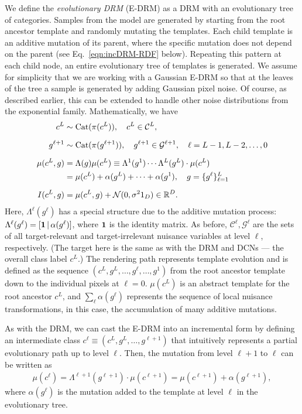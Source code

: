 \documentclass[12pt]{article}
\newcommand{\R}[0]{{ \mathbb{R} }}
\newcommand{\Cl}[0]{{ \mathcal{C} }}
\newcommand{\G}[0]{{ \mathcal{G} }}
\begin{document}
We define the \emph{evolutionary DRM} (E-DRM) as a DRM with an evolutionary tree of categories. Samples from the model are generated by starting from the root ancestor template and randomly mutating the templates. Each child template is an additive mutation of its parent, where the specific mutation does not depend on the parent (see Eq.~\ref{eqn:incDRM-RDF} below). 
Repeating this pattern at each child node, an entire evolutionary tree of templates is generated. We assume for simplicity that we are working with a Gaussian E-DRM so that at the leaves of the tree a sample is generated by adding Gaussian pixel noise. Of course, as described earlier, this can be extended to handle other noise distributions from the exponential family. Mathematically, we have
\begin{align} 
	c^{L} &\sim{\rm Cat}(\pi(c^{L})), \quad c^{L} \in \Cl^{L},	
	\nonumber \\[2mm]
	g^{\ell+1} &\sim{\rm Cat}(\pi(g^{\ell+1})), \quad g^{\ell+1} \in \G^{\ell+1}, \quad \ell = L-1, L-2, \dots, 0 	 
	\nonumber \\[2mm]	
	\mu(c^{L}, g) &=  \Lambda(g) \mu(c^{L}) \equiv \Lambda^{1}(g^{1}) \cdots \Lambda^{L}(g^{L}) \cdot \mu(c^{L})
	\nonumber \\
	&= \mu(c^{L}) + \alpha(g^{L}) + \cdots + \alpha(g^{1}), \quad g=\{g^{\ell}\}_{\ell=1}^{L}
	\nonumber \\[2mm]
	I(c^{L},g) &= \mu(c^{L}, g) + \mathcal{N}(0, \sigma^{2} 1_{D}) \in \R^{D}.
	\label{eqn:DRM-RDF}
\end{align}
Here, $\Lambda^{\ell}(g^{\ell})$ has a special structure due to the additive mutation process: $\Lambda^{\ell}(g^{\ell}) = [ {\bf 1} \, |\, \alpha(g^{\ell}) ]$, where ${\bf 1}$ is the identity matrix. As before, $\Cl^{\ell}, \G^{\ell}$ are the sets of all target-relevant and target-irrelevant nuisance variables at level $\ell$, respectively. (The target here is the same as with the DRM and DCNs --- the overall class label $c^L$.) The rendering path represents template evolution and is defined as the sequence $(c^{L},g^{L},\ldots,g^{\ell},\ldots,g^{1})$ from the root ancestor template down to the individual pixels at $\ell=0$.  $\mu(c^{L})$ is an abstract template for the root ancestor $c^{L}$, and $\sum_{\ell} \alpha(g^{\ell})$ represents the sequence of local nuisance transformations, in this case, the accumulation of many additive mutations. 

As with the DRM, we can cast the E-DRM into an incremental form by defining an intermediate class $c^{\ell} \equiv (c^{L}, g^{L}, \ldots, g^{\ell+1})$ that intuitively represents a partial evolutionary path up to level $\ell$. Then, the mutation from level $\ell+1$ to $\ell$ can be written as
\begin{align} 
   \mu(c^{\ell}) = \Lambda^{\ell+1}(g^{\ell+1}) \cdot \mu(c^{\ell+1}) = \mu(c^{\ell+1}) + \alpha(g^{\ell + 1}),
   \label{eqn:incDRM-RDF}
\end{align}
where $\alpha(g^{\ell})$ is the mutation added to the template at level $\ell$ in the evolutionary tree.
\end{document}
